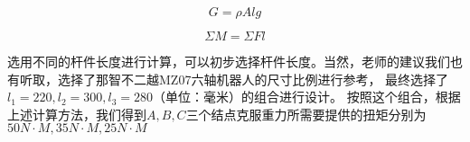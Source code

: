     \begin{equation}
        \label{eq:gravity}
        G= \rho Alg
    \end{equation}

    \begin{equation}
        \label{eq:static equilibrium}
        \Sigma M=\Sigma Fl
    \end{equation}

    选用不同的杆件长度进行计算，可以初步选择杆件长度。当然，老师的建议我们也有听取，选择了那智不二越MZ07六轴机器人的尺寸比例进行参考，
    最终选择了$l_1 = 220, l_2 = 300, l_3 = 280$（单位：毫米）的组合进行设计。
    按照这个组合，根据上述计算方法，我们得到$A,B,C$三个结点克服重力所需要提供的扭矩分别为$50 N\cdot M, 35 N\cdot M, 25 N\cdot M$

